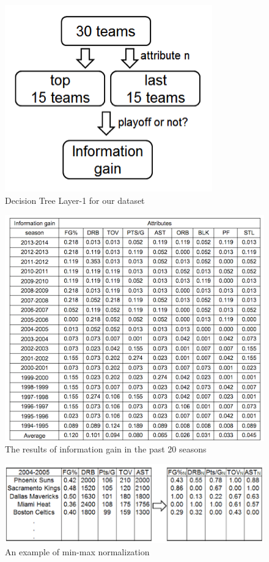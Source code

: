 \documentclass{acm_proc_article-sp}
\begin{document}
\begin{figure}[!htb]
\includegraphics{DT.png}
\caption{Decision Tree Layer-1 for our dataset}
\end{figure}

\begin{figure}[!htb]
\includegraphics{Table.png}
\caption{The results of information gain in the past 20 seasons}
\end{figure}

\vspace{8em}

\begin{figure}[!htb]
\includegraphics{Norm.png}
\caption{An example of min-max normalization}
\end{figure}
\end{document}
